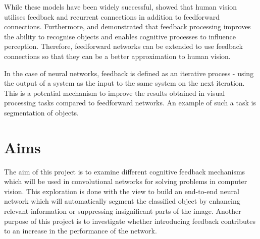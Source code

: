 \documentclass{l4proj}
\begin{document}
While these models have been widely successful, \cite{feedbackcon} showed that human vision utilises feedback and recurrent connections in addition to feedforward connections. Furthermore, \cite{cognitive} and \cite{objectrec} demonstrated that feedback processing improves the ability to recognise objects and enables cognitive processes to influence perception.
Therefore, feedforward networks can be extended to use feedback connections so that they can be a better approximation to human vision.

In the case of neural networks, feedback is defined as an iterative process - using the output of a system as the input to the same system on the next iteration. This is a potential mechanism to improve the results obtained in visual processing tasks compared to feedforward networks. An example of such a task is segmentation of objects.


\section{Aims}
The aim of this project is to examine different cognitive feedback mechanisms which will be used in convolutional networks for solving problems in computer vision. This exploration is done with the view to build an end-to-end neural network which will automatically segment the classified object by enhancing relevant information or suppressing insignificant parts of the image. Another purpose of this project is to investigate whether introducing feedback contributes to an increase in the performance of the network.

\end{document}
